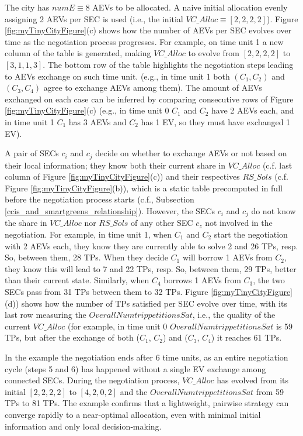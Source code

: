 The city has $numE \equiv 8$ AEVs to be allocated. A naive initial allocation evenly assigning 2 AEVs per SEC
is used (i.e., the initial $VC\_Alloc \equiv [2, 2, 2, 2]$). Figure \ref{fig:myTinyCityFigure}(c) shows how the number
of AEVs per SEC evolves over time as the
negotiation process progresses. For example, on time unit 1 a new column of the table is generated,
making $VC\_Alloc$ to evolve from $[2, 2, 2, 2]$ to $[3, 1, 1, 3]$.
The bottom row of the table highlights the negotiation steps leading to AEVs exchange on such time unit. (e.g., in time unit 1
both $(C_1, C_2)$ and $(C_3, C_4)$ agree to exchange AEVs among them). The amount of AEVs exchanged on each case can be
inferred by comparing consecutive rows of Figure \ref{fig:myTinyCityFigure}(c) (e.g., in time unit 0 $C_1$ and $C_2$
have 2 AEVs each, and in time unit 1 $C_1$ has 3 AEVs and $C_2$ has 1 EV, so they must have exchanged 1 EV).

A pair of SECs $c_i$ and $c_j$ decide on whether to exchange AEVs or not based on their local information;
they know both their current share in $VC\_Alloc$ (c.f. last column of Figure \ref{fig:myTinyCityFigure}(c))
and their respectives $RS\_Sols$ (c.f. Figure \ref{fig:myTinyCityFigure}(b)), which is a static table precomputed
in full before the negotiation process starts (c.f., Subsection \ref{ccis_and_smartgreens_relationship}).
However, the SECs $c_i$ and $c_j$ do not know the share
in $VC\_Alloc$ nor $RS\_Sols$ of any other SEC $c_z$ not involved in the negotiation.
For example, in time unit 1, when $C_1$ and $C_2$ start the negotiation with 2 AEVs each, they know they are currently
able to solve 2 and 26 TPs, resp. So, between them, 28 TPs. When they decide $C_1$ will borrow 1 AEVs from $C_2$,
they know this will lead to 7 and 22 TPs, resp. So, between them, 29 TPs, better than their current state. Similarly,
when $C_4$ borrows 1 AEVs from $C_3$, the two SECs pass from 31 TPs between them to 32 TPs.
Figure \ref{fig:myTinyCityFigure}(d)) shows how the number of TPs satisfied per SEC evolve over time, with its
last row measuring the $OverallNumtrip petitionsSat$, i.e., the quality of the current $VC\_Alloc$ (for example, in time unit 0
$OverallNumtrip petitionsSat$ is 59 TPs, but after the exchange of both ($C_1$, $C_2$) and ($C_3$, $C_4$) it reaches 61 TPs.

In the example the negotiation ends after 6 time units, as an entire negotiation cycle (steps 5 and 6) has happened
without a single EV exchange among connected SECs. During the negotiation process, $VC\_Alloc$ has evolved from
its initial $[2, 2, 2, 2]$ to $[4, 2, 0, 2]$ and the $OverallNumtrip petitionsSat$ from 59 TPs to 81 TPs.
The example confirms that a lightweight, pairwise strategy can converge rapidly to a
near‑optimal allocation, even with minimal initial information and only local decision‑making.

